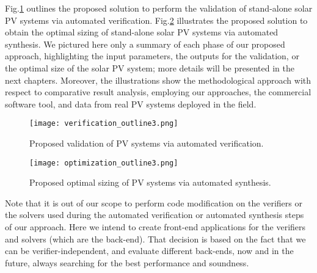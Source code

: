 Fig.\ref{fig:validation_outline} outlines the proposed solution to perform the validation of stand-alone solar PV systems via automated verification. Fig.\ref{fig:optimization_outline} illustrates the proposed solution to obtain the optimal sizing of stand-alone solar PV systems via automated synthesis. We pictured here only a summary of each phase of our proposed approach, highlighting the input parameters, the outputs for the validation, or the optimal size of the solar PV system; more details will be presented in the next chapters. Moreover, the illustrations show the methodological approach with respect to comparative result analysis, employing our approaches, the commercial software tool, and data from real PV systems deployed in the field.

\begin{figure}[h]
\texttt{[image: verification\_outline3.png]}
\centering
\caption{Proposed validation of PV systems via automated verification.}
\label{fig:validation_outline} 
\end{figure}


\begin{figure}[h]
\texttt{[image: optimization\_outline3.png]}
\centering
\caption{Proposed optimal sizing of PV systems via automated synthesis.}
\label{fig:optimization_outline} 
\end{figure}

Note that it is out of our scope to perform code modification on the verifiers or the solvers used during the automated verification or automated synthesis steps of our approach. Here we intend to create front-end applications for the verifiers and solvers (which are the back-end). That decision is based on the fact that we can be verifier-independent, and evaluate different back-ends, now and in the future, always searching for the best performance and soundness.

